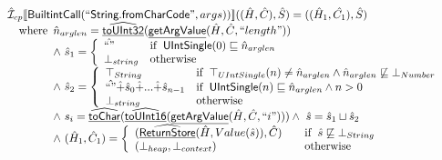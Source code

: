 \documentclass{article}
\newcommand{\SF}[1]{\mbox{\textsf{#1}}}
\newcommand{\wherec}[1]{{\rm where}\begin{array}[t]{l}#1\end{array}}
\newcommand{\ifc}[1]{{\rm if}\begin{array}[t]{l}#1\end{array}}
\newcommand{\owc}{{\rm otherwise}}
\newcommand{\aI}{\hat{\mathcal{I}}}
\newcommand{\lbr}{\llbracket}
\newcommand{\rbr}{\rrbracket}
\newcommand{\hf}[1]{\underline{\sf #1}}
\newcommand{\ahf}[1]{\widehat{\underline{\sf #1}}}
\begin{document}
\[\begin{array}{l}
\aI _{cp}\lbr \SF{BuiltintCall}(``\SF{String.fromCharCode}",args))\rbr((\hat{H},\hat{C}), \hat{S})
  = ((\hat{H}_1, \hat{C_1}), \hat{S})\\
\quad\wherec{
  \hat{n}_{arglen} = \ahf{toUInt32}(\hf{getArgValue}(\hat{H}, \hat{C}, ``length"))\\
  \land\ \hat{s}_1 = \left\{\begin{array}{ll}
       \hat{``"}
       & \ifc{\SF{UIntSingle}(0) \sqsubseteq \hat{n}_{arglen}}\\
     \bot_{string}& \owc
     \end{array}\right.\\
  \land\ \hat{s}_2 = \left\{\begin{array}{ll}
       \top_{String}
       & \ifc{\top_{UIntSingle}(n) \neq \hat{n}_{arglen} \land \hat{n}_{arglen} \not\sqsubseteq \bot_{Number}}\\
       \hat{``"} \hat{+} \hat{s}_0 \hat{+} ... \hat{+} \hat{s}_{n-1}
       & \ifc{\SF{UIntSingle}(n) \sqsubseteq \hat{n}_{arglen} \land n > 0}\\
       \bot_{string} & \owc
     \end{array}\right.\\
  \land\ s_i = \ahf{toChar}(\ahf{toUInt16}(\hf{getArgValue}(\hat{H}, \hat{C}, ``i"))) 
  \land\ \hat{s} = \hat{s}_1 \sqcup \hat{s}_2\\
  \land\ (\hat{H}_1, \hat{C}_1) = 
    \left\{\begin{array}{l@{\quad\quad}l}
      (\ahf{ReturnStore}(\hat{H}, Value(\hat{s})), \hat{C})
      & \ifc{\hat{s} \not\sqsubseteq \bot_{String}}\\
      (\bot_{heap}, \bot_{context}) & \owc \\
    \end{array}\right.\\
  }\\
\\\\  



\end{array}
\]
\end{document}

